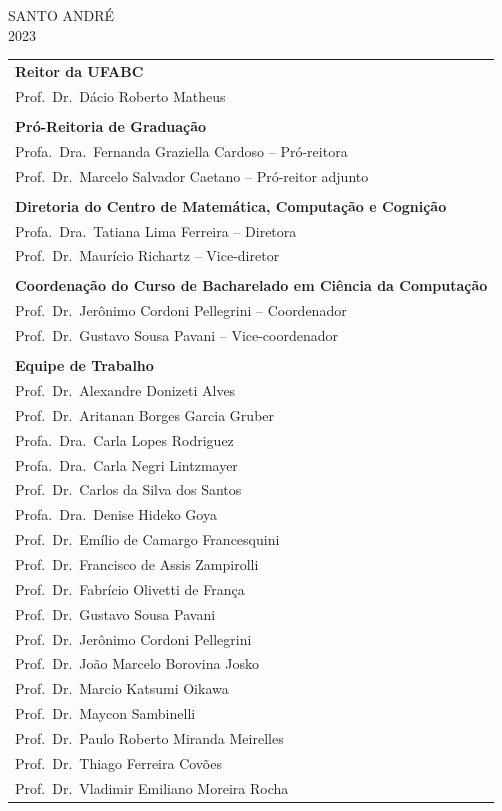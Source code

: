\documentclass[a4paper]{article}
\begin{document}
\begin{center}
    SANTO ANDRÉ \\ 2023
\end{center}

\newpage

\begin{tabular}{l}
    \textbf{Reitor da UFABC}\\
    Prof.\ Dr.\ Dácio Roberto Matheus\\
    \\
    \textbf{Pró-Reitoria de Graduação}\\
    Profa.\ Dra.\ Fernanda Graziella Cardoso -- Pró-reitora\\
    Prof.\ Dr.\ Marcelo Salvador Caetano -- Pró-reitor adjunto\\
    \\
    \textbf{Diretoria do Centro de Matemática, Computação e Cognição}\\
    Profa.\ Dra.\ Tatiana Lima Ferreira -- Diretora\\
    Prof.\ Dr.\ Maurício Richartz -- Vice-diretor\\
    \\
    \textbf{Coordenação do Curso de Bacharelado em Ciência da Computação}\\
    Prof.\ Dr.\ Jerônimo Cordoni Pellegrini -- Coordenador\\
    Prof.\ Dr.\ Gustavo Sousa Pavani -- Vice-coordenador\\
    \\
    \textbf{Equipe de Trabalho}\\
    Prof.\ Dr.\ Alexandre Donizeti Alves\\
    Prof.\ Dr.\ Aritanan Borges Garcia Gruber\\
    Profa.\ Dra.\ Carla Lopes Rodriguez\\
    Profa.\ Dra.\ Carla Negri Lintzmayer\\
    Prof.\ Dr.\ Carlos da Silva dos Santos\\
    Profa.\ Dra.\ Denise Hideko Goya\\
    Prof.\ Dr.\ Emílio de Camargo Francesquini\\
    Prof.\ Dr.\ Francisco de Assis Zampirolli\\
    Prof.\ Dr.\ Fabrício Olivetti de França\\
    Prof.\ Dr.\ Gustavo Sousa Pavani\\
    Prof.\ Dr.\ Jerônimo Cordoni Pellegrini\\
    Prof.\ Dr.\ João Marcelo Borovina Josko\\
    Prof.\ Dr.\ Marcio Katsumi Oikawa\\
    Prof.\ Dr.\ Maycon Sambinelli\\
    Prof.\ Dr.\ Paulo Roberto Miranda Meirelles\\
    Prof.\ Dr.\ Thiago Ferreira Covões\\
    Prof.\ Dr.\ Vladimir Emiliano Moreira Rocha\\
\end{tabular}
\end{document}
